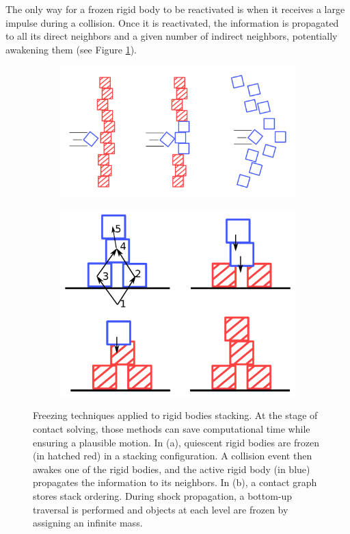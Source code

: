 The only way for a frozen rigid body to be reactivated is when it receives a large impulse during a collision.
Once it is reactivated, the information is propagated to all its direct neighbors and a given number of indirect neighbors, potentially awakening them (see Figure \ref{fig:stackFreezing}).
\begin{figure}[!h]
	\centering
	\begin{subfigure}[b]{0.45\linewidth}
		\centering
		\includegraphics[scale=0.5]{images/starAdaptivity-cgf2016/freezing-rigid.png}
		\caption{\label{fig:stackFreezing}}
	\end{subfigure}
	\hfill
	\begin{subfigure}[b]{0.45\linewidth}
		\centering
		\includegraphics[scale=0.7, angle=0]{images/starAdaptivity-cgf2016/freezing-graph.png}
		\caption{\label{fig:graphFreezing}}
	\end{subfigure}
	\caption[STAR adaptivity: Rigid body freezing]{
		\label{fig:freezingTechniques}
		Freezing techniques applied to rigid bodies stacking. At the stage of contact solving, those methods can save computational time while ensuring a plausible motion.
		In (a), quiescent rigid bodies are frozen (in hatched red) in a stacking configuration. A collision event then awakes one of the rigid bodies, and the active rigid body (in blue) propagates the information to its neighbors.
		In (b), a contact graph stores stack ordering. During shock propagation, a bottom-up traversal is performed and objects at each level are frozen by assigning an infinite mass.
	}
\end{figure}
